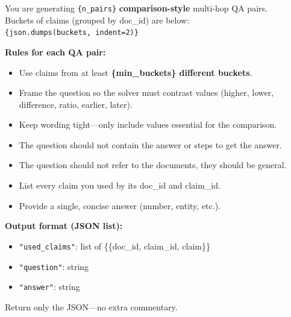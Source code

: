 \begin{tcolorbox}[
    colback=lightgray!20, 
    colframe=gray, 
    title={\textbf{Comparison-Style Multi-Hop QA Prompt}}, 
    fonttitle=\bfseries,
    sharp corners=southwest,
    coltitle=black,
    label=prompt:p5
]
\small

You are generating \texttt{\{n\_pairs\}} \textbf{comparison-style} multi-hop QA pairs. \\
Buckets of claims (grouped by doc\_id) are below: \\
\texttt{\{json.dumps(buckets, indent=2)\}}

\vspace{0.2cm}
\textbf{Rules for each QA pair:}
\begin{itemize}
    \item Use claims from at least \textbf{\{min\_buckets\} different buckets}.
    \item Frame the question so the solver must contrast values (higher, lower, difference, ratio, earlier, later).
    \item Keep wording tight—only include values essential for the comparison.
    \item The question should not contain the answer or steps to get the answer.
    \item The question should not refer to the documents, they should be general.
    \item List every claim you used by its doc\_id and claim\_id.
    \item Provide a single, concise answer (number, entity, etc.).
\end{itemize}

\vspace{0.2cm}
\textbf{Output format (JSON list):}
\begin{itemize}
    \item \texttt{"used\_claims"}: list of \{\{doc\_id, claim\_id, claim\}\}
    \item \texttt{"question"}: string
    \item \texttt{"answer"}: string
\end{itemize}

Return only the JSON—no extra commentary.

\end{tcolorbox}

